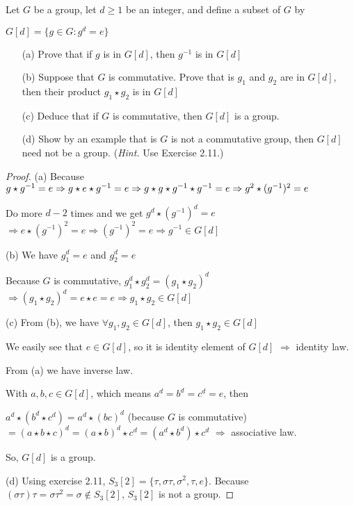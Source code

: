 \begin{exer}[2.12]
Let $G$ be a group, let $d \geq 1$ be an integer, and define a subset of $G$ by

\begin{center}
    $G[d] = \{g \in G: g^d = e\}$
\end{center}

\begin{enumerate}
    \item [(a)] Prove that if $g$ is in $G[d]$, then $g^{-1}$ is in $G[d]$
    \item [(b)] Suppose that $G$ is commutative. Prove that is $g_1$ and $g_2$ are in $G[d]$, then their product $g_1 \star g_2$ is in $G[d]$
    \item [(c)] Deduce that if $G$ is commutative, then $G[d]$ is a group.
    \item [(d)] Show by an example that is $G$ is not a commutative group, then $G[d]$ need not be a group. (\textit{Hint.} Use Exercise 2.11.)
\end{enumerate}
\end{exer}

\begin{proof}
(a) Because $g \star g^{-1} = e \Rightarrow g \star e \star g^{-1} = e \\ \Rightarrow g \star g \star g^{-1} \star g^{-1} = e \Rightarrow g^2 \star (g^{-1})^2 = e$

Do more $d-2$ times and we get $g^d \star (g^{-1})^d = e$ \\ $\Rightarrow e \star (g^{-1})^2 = e \Rightarrow (g^{-1})^2 = e \Rightarrow g^{-1} \in G[d]$

(b) We have $g_1^d = e$ and $g_2^d = e$

Because $G$ is commutative, $g_1^d \star g_2^d = (g_1 \star g_2)^d$ \\ $\Rightarrow (g_1 \star g_2)^d = e \star e = e \Rightarrow g_1 \star g_2 \in G[d]$

(c) From (b), we have $\forall g_1, g_2 \in G[d]$, then $g_1 \star g_2 \in G[d]$

We easily see that $e \in G[d]$, so it is identity element of $G[d]$ $\Rightarrow$ identity law.

From (a) we have inverse law.

With $a, b, c \in G[d]$, which means $a^d = b^d = c^d = e$, then

$a^d \star (b^d \star c^d) = a^d \star (bc)^d$ (because $G$ is commutative) $=(a \star b \star c)^d = (a \star b)^d \star c^d = (a^d \star b^d) \star c^d$ $\Rightarrow$ associative law.

So, $G[d]$ is a group.

(d) Using exercise 2.11, $S_3[2] = \{\tau, \sigma\tau, \sigma^2, \tau, e \}$. Because $(\sigma\tau)\tau = \sigma\tau^2 = \sigma \notin S_3[2]$, $S_3[2]$ is not a group. 
\end{proof}

